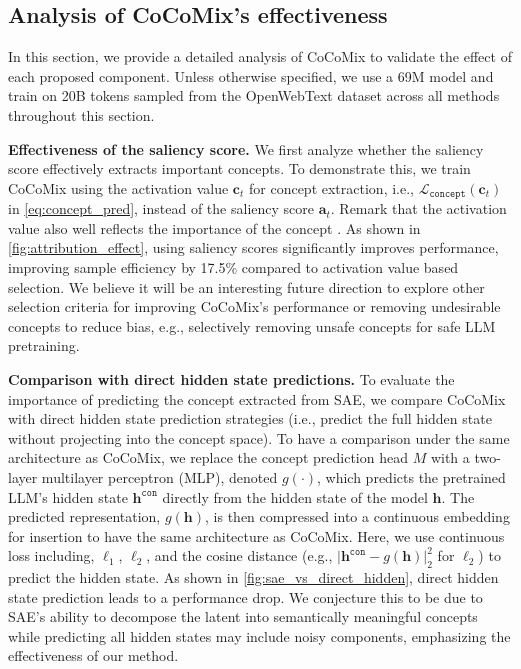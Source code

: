 \documentclass[]{fairmeta}
\def\rva{{\mathbf{a}}}
\def\rvc{{\mathbf{c}}}
\def\rvh{{\mathbf{h}}}
\newcommand{\sname}{CoCoMix\xspace}
\begin{document}
\subsection{Analysis of  \sname's effectiveness }
\label{sec:analysis}

In this section, we provide a detailed analysis of \sname to validate the effect of each proposed component. Unless otherwise specified, we use a 69M model and train on 20B tokens sampled from the OpenWebText dataset across all methods throughout this section.

\textbf{Effectiveness of the saliency score.} We first analyze whether the saliency score effectively extracts important concepts. To demonstrate this, we train \sname using the activation value $\rvc_t$ for concept extraction, i.e., $\mathcal{L}_{\mathtt{concept}}(\rvc_t)$ in \autoref{eq:concept_pred}, instead of the saliency score $\rva_t$. Remark that the activation value also well reflects the importance of the concept \citep{bricken2023monosemanticity}. As shown in \autoref{fig:attribution_effect}, using saliency scores significantly improves performance, improving sample efficiency by 17.5\% compared to activation value based selection. We believe it will be an interesting future direction to explore other selection criteria for improving \sname's performance or removing undesirable concepts to reduce bias, e.g., selectively removing unsafe concepts for safe LLM pretraining.

\textbf{Comparison with direct hidden state predictions.} To evaluate the importance of predicting the concept extracted from SAE, we compare \sname with direct hidden state prediction strategies (i.e., predict the full hidden state without projecting into the concept space). To have a comparison under the same architecture as \sname, we replace the concept prediction head $M$ with a two-layer multilayer perceptron (MLP), denoted $g(\cdot)$, which predicts the pretrained LLM's hidden state $\rvh^{\mathtt{con}}$ directly from the hidden state of the model $\rvh$. The predicted representation, $g(\rvh)$, is then compressed into a continuous embedding for insertion to have the same architecture as \sname. Here, we use continuous loss including, $\ell_1$, $\ell_2$, and the cosine distance (e.g., $\lvert \rvh^{\mathtt{con}} - g(\rvh) \rvert_2^2$ for $\ell_2$) to predict the hidden state. As shown in \autoref{fig:sae_vs_direct_hidden}, direct hidden state prediction leads to a performance drop. We conjecture this to be due to SAE's ability to decompose the latent into semantically meaningful concepts while predicting all hidden states may include noisy components, emphasizing the effectiveness of our method.
\end{document}
